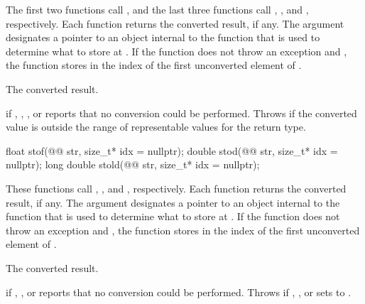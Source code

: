 \documentclass[ebook,11pt,article]{memoir}
\begin{document}
\begin{itemdescr}
\pnum
\effects {}
The first two functions call ,
and the last three functions call ,
, and , respectively. Each function returns the converted result, if any. The
argument  designates a pointer to an object internal to the function
that is used to determine what to store at . If the function does
not throw an exception and , the function stores in 
the index of the first unconverted element of .

\pnum
\returns The converted result.

\pnum
\throws {} if , , , or
 reports that no conversion could be performed. Throws
 if the converted value is outside the range of representable values
for the return type.
\end{itemdescr}

%
%
%
\begin{itemdecl}
float stof(@@ str, size_t* idx = nullptr);
double stod(@@ str, size_t* idx = nullptr);
long double stold(@@ str, size_t* idx = nullptr);
\end{itemdecl}

\begin{itemdescr}
\pnum
\effects {}
These functions call ,
, and ,
respectively. Each function returns the converted
result, if any. The argument  designates a pointer to an object internal to
the function that is used to determine what to store at . If the function
does not throw an exception and , the function stores in 
the index of the first unconverted element of .

\pnum
\returns The converted result.

\pnum
\throws {} if , , or  reports that no
conversion could be performed. Throws  if , , or
 sets  to .
\end{itemdescr}
\end{document}
